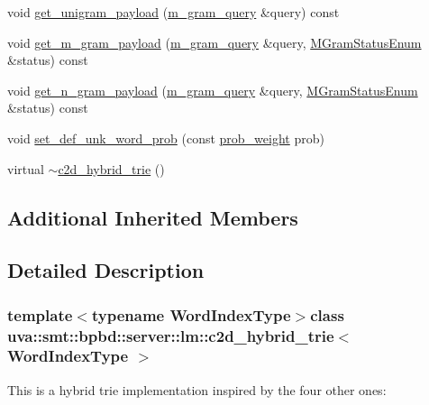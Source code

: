 \begin{DoxyCompactItemize}
\item 
void \hyperlink{classuva_1_1smt_1_1bpbd_1_1server_1_1lm_1_1c2d__hybrid__trie_a053e6bc6b83019aaeeb42c3f05c13feb}{get\+\_\+unigram\+\_\+payload} (\hyperlink{classuva_1_1smt_1_1bpbd_1_1server_1_1lm_1_1m__gram__query}{m\+\_\+gram\+\_\+query} \&query) const 
\item 
void \hyperlink{classuva_1_1smt_1_1bpbd_1_1server_1_1lm_1_1c2d__hybrid__trie_a5d02500d4119d1abf3001b953f44707a}{get\+\_\+m\+\_\+gram\+\_\+payload} (\hyperlink{classuva_1_1smt_1_1bpbd_1_1server_1_1lm_1_1m__gram__query}{m\+\_\+gram\+\_\+query} \&query, \hyperlink{namespaceuva_1_1smt_1_1bpbd_1_1server_1_1lm_ab9b3e7382b561dcb8abcd6b55e9b796a}{M\+Gram\+Status\+Enum} \&status) const 
\item 
void \hyperlink{classuva_1_1smt_1_1bpbd_1_1server_1_1lm_1_1c2d__hybrid__trie_ad3987ced1fe1c0020c49a439641de1dc}{get\+\_\+n\+\_\+gram\+\_\+payload} (\hyperlink{classuva_1_1smt_1_1bpbd_1_1server_1_1lm_1_1m__gram__query}{m\+\_\+gram\+\_\+query} \&query, \hyperlink{namespaceuva_1_1smt_1_1bpbd_1_1server_1_1lm_ab9b3e7382b561dcb8abcd6b55e9b796a}{M\+Gram\+Status\+Enum} \&status) const 
\item 
void \hyperlink{classuva_1_1smt_1_1bpbd_1_1server_1_1lm_1_1c2d__hybrid__trie_a255a7699dbcd0032e5eeea6aeb4a36df}{set\+\_\+def\+\_\+unk\+\_\+word\+\_\+prob} (const \hyperlink{namespaceuva_1_1smt_1_1bpbd_1_1server_a01e9ea4de9c226f4464862e84ff0bbcc}{prob\+\_\+weight} prob)
\item 
virtual \hyperlink{classuva_1_1smt_1_1bpbd_1_1server_1_1lm_1_1c2d__hybrid__trie_a6d2c2081976b783fb3cce2337ccbd95a}{$\sim$c2d\+\_\+hybrid\+\_\+trie} ()
\end{DoxyCompactItemize}
\subsection*{Additional Inherited Members}


\subsection{Detailed Description}
\subsubsection*{template$<$typename Word\+Index\+Type$>$class uva\+::smt\+::bpbd\+::server\+::lm\+::c2d\+\_\+hybrid\+\_\+trie$<$ Word\+Index\+Type $>$}

This is a hybrid trie implementation inspired by the four other ones\+:

